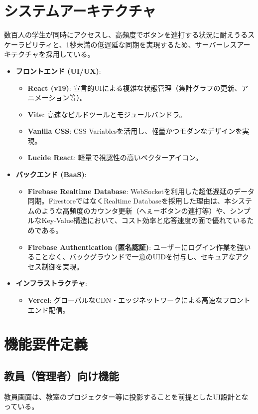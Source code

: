 \documentclass[11pt,a4paper]{jsarticle}
\begin{document}
\section{システムアーキテクチャ}

数百人の学生が同時にアクセスし、高頻度でボタンを連打する状況に耐えうるスケーラビリティと、1秒未満の低遅延な同期を実現するため、サーバーレスアーキテクチャを採用している。

\begin{itemize}
    \item \textbf{フロントエンド (UI/UX)}:
    \begin{itemize}
        \item \textbf{React (v19)}: 宣言的UIによる複雑な状態管理（集計グラフの更新、アニメーション等）。
        \item \textbf{Vite}: 高速なビルドツールとモジュールバンドラ。
        \item \textbf{Vanilla CSS}: CSS Variablesを活用し、軽量かつモダンなデザインを実現。
        \item \textbf{Lucide React}: 軽量で視認性の高いベクターアイコン。
    \end{itemize}
    \item \textbf{バックエンド (BaaS)}:
    \begin{itemize}
        \item \textbf{Firebase Realtime Database}: WebSocketを利用した超低遅延のデータ同期。FirestoreではなくRealtime Databaseを採用した理由は、本システムのような高頻度のカウンタ更新（へぇーボタンの連打等）や、シンプルなKey-Value構造において、コスト効率と応答速度の面で優れているためである。
        \item \textbf{Firebase Authentication (匿名認証)}: ユーザーにログイン作業を強いることなく、バックグラウンドで一意のUIDを付与し、セキュアなアクセス制御を実現。
    \end{itemize}
    \item \textbf{インフラストラクチャ}:
    \begin{itemize}
        \item \textbf{Vercel}: グローバルなCDN・エッジネットワークによる高速なフロントエンド配信。
    \end{itemize}
\end{itemize}

\section{機能要件定義}

\subsection{教員（管理者）向け機能}
教員画面は、教室のプロジェクター等に投影することを前提としたUI設計となっている。
\end{document}
